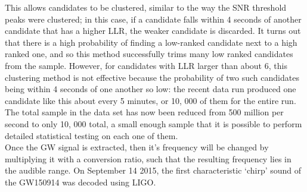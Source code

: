 This allows candidates to be clustered, similar to the way the SNR threshold peaks were clustered; in this case, if a candidate falls within 4 seconds of another candidate that has a higher LLR, the weaker candidate is discarded. It turns out that there is a high probability of finding a low-ranked candidate next to a high ranked one, and so this method successfully trims many low ranked candidates from the sample. However, for candidates with LLR larger than about 6, this clustering method is not effective because the probability of two such candidates being within 4 seconds of one another so low: the recent data run produced one candidate like this about every 5 minutes, or 10, 000 of them for the entire run. The total sample in the data set has now been reduced from 500 million per second to only 10, 000 total, a small enough sample that it is possible to perform detailed statistical testing on each one of them.\\

Once the GW signal is extracted, then it's frequency will be changed by multiplying it with a conversion ratio, such that the resulting frequency lies in the audible range. On September 14 2015, the first characteristic `chirp' sound of the GW150914 was decoded using LIGO. 

\pagebreak
